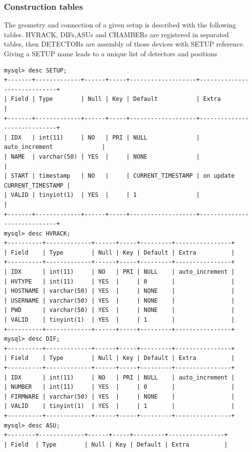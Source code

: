 \documentclass[english]{article}
\begin{document}
\subsubsection{Construction tables}
The geometry and connection of a given setup is described with the following tables. HVRACK, DIFs,ASUs and CHAMBERs are registered in separated tables, then DETECTORs are assembly of those devices with SETUP reference. Giving a SETUP name leads to a unique list of detectors and positions
\begin{verbatim}
mysql> desc SETUP;
+-------+-------------+------+-----+-------------------+-----------------------------+
| Field | Type        | Null | Key | Default           | Extra                       |
+-------+-------------+------+-----+-------------------+-----------------------------+
| IDX   | int(11)     | NO   | PRI | NULL              | auto_increment              |
| NAME  | varchar(50) | YES  |     | NONE              |                             |
| START | timestamp   | NO   |     | CURRENT_TIMESTAMP | on update CURRENT_TIMESTAMP |
| VALID | tinyint(1)  | YES  |     | 1                 |                             |
+-------+-------------+------+-----+-------------------+-----------------------------+
mysql> desc HVRACK;
+----------+-------------+------+-----+---------+----------------+
| Field    | Type        | Null | Key | Default | Extra          |
+----------+-------------+------+-----+---------+----------------+
| IDX      | int(11)     | NO   | PRI | NULL    | auto_increment |
| HVTYPE   | int(11)     | YES  |     | 0       |                |
| HOSTNAME | varchar(50) | YES  |     | NONE    |                |
| USERNAME | varchar(50) | YES  |     | NONE    |                |
| PWD      | varchar(50) | YES  |     | NONE    |                |
| VALID    | tinyint(1)  | YES  |     | 1       |                |
+----------+-------------+------+-----+---------+----------------+
mysql> desc DIF;
+----------+-------------+------+-----+---------+----------------+
| Field    | Type        | Null | Key | Default | Extra          |
+----------+-------------+------+-----+---------+----------------+
| IDX      | int(11)     | NO   | PRI | NULL    | auto_increment |
| NUMBER   | int(11)     | YES  |     | 0       |                |
| FIRMWARE | varchar(50) | YES  |     | NONE    |                |
| VALID    | tinyint(1)  | YES  |     | 1       |                |
+----------+-------------+------+-----+---------+----------------+
mysql> desc ASU;
+--------+-------------+------+-----+---------+----------------+
| Field  | Type        | Null | Key | Default | Extra          |

\end{verbatim}
\end{document}
